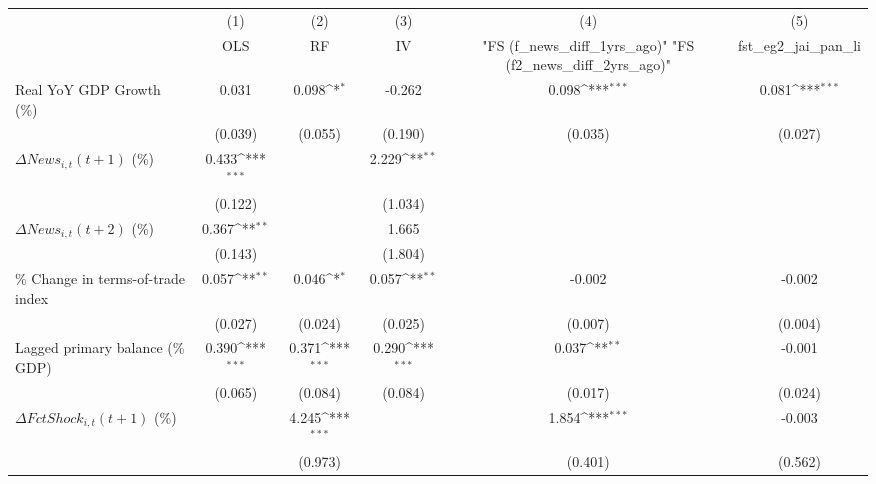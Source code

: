 {
\def\sym#1{\ifmmode^{#1}\else\(^{#1}\)\fi}
\begin{tabular}{l*{5}{c}}
\toprule
                    &\multicolumn{1}{c}{(1)}&\multicolumn{1}{c}{(2)}&\multicolumn{1}{c}{(3)}&\multicolumn{1}{c}{(4)}&\multicolumn{1}{c}{(5)}\\
                    &\multicolumn{1}{c}{OLS}&\multicolumn{1}{c}{RF}&\multicolumn{1}{c}{IV}&\multicolumn{1}{c}{ "FS (f_news_diff_1yrs_ago)"  "FS (f2_news_diff_2yrs_ago)" }&\multicolumn{1}{c}{fst_eg2_jai_pan_li}\\
\midrule
Real YoY GDP Growth (\%)&       0.031         &       0.098\sym{*}  &      -0.262         &       0.098\sym{***}&       0.081\sym{***}\\
                    &     (0.039)         &     (0.055)         &     (0.190)         &     (0.035)         &     (0.027)         \\
\addlinespace
$ \Delta News_{i,t}(t+1)$ (\%)&       0.433\sym{***}&                     &       2.229\sym{**} &                     &                     \\
                    &     (0.122)         &                     &     (1.034)         &                     &                     \\
\addlinespace
$ \Delta News_{i,t}(t+2)$ (\%)&       0.367\sym{**} &                     &       1.665         &                     &                     \\
                    &     (0.143)         &                     &     (1.804)         &                     &                     \\
\addlinespace
\% Change in terms-of-trade index&       0.057\sym{**} &       0.046\sym{*}  &       0.057\sym{**} &      -0.002         &      -0.002         \\
                    &     (0.027)         &     (0.024)         &     (0.025)         &     (0.007)         &     (0.004)         \\
\addlinespace
Lagged primary balance (\% GDP)&       0.390\sym{***}&       0.371\sym{***}&       0.290\sym{***}&       0.037\sym{**} &      -0.001         \\
                    &     (0.065)         &     (0.084)         &     (0.084)         &     (0.017)         &     (0.024)         \\
\addlinespace
$ \Delta FctShock_{i,t}(t+1)$ (\%)&                     &       4.245\sym{***}&                     &       1.854\sym{***}&      -0.003         \\
                    &                     &     (0.973)         &                     &     (0.401)         &     (0.562)         \\

\end{tabular}}
